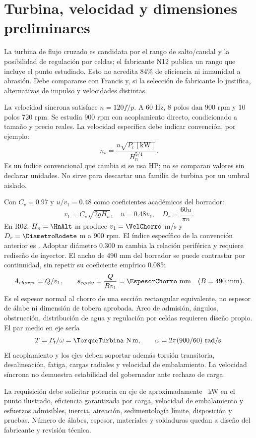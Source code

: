 
\section{Turbina, velocidad y dimensiones preliminares}
La turbina de flujo cruzado es candidata por el rango de salto/caudal y la posibilidad de regulación por celdas; el fabricante N12 publica un rango que incluye el punto estudiado. Esto no acredita 84\% de eficiencia ni inmunidad a abrasión. Debe compararse con Francis y, si la selección de fabricante lo justifica, alternativas de impulso y velocidades distintas.

La velocidad síncrona satisface $n=120f/p$. A 60 Hz, 8 polos dan 900 rpm y 10 polos 720 rpm. Se estudia 900 rpm con acoplamiento directo, condicionado a tamaño y precio reales. La velocidad específica debe indicar convención, por ejemplo:
\[
n_s=\frac{n\sqrt{P_t\,[\mathrm{kW}]}}{H_n^{5/4}}.
\]
Es un índice convencional que cambia si se usa HP; no se comparan valores sin declarar unidades. No sirve para descartar una familia de turbina por un umbral aislado.

Con $C_v=0.97$ y $u/v_1=0.48$ como coeficientes académicos del borrador:
\[
v_1=C_v\sqrt{2gH_n},\quad u=0.48v_1,\quad D_r=\frac{60u}{\pi n}.
\]
En R02, $H_n=\HnAlt$ m produce $v_1=\VelChorro$ m/s y $D_r=\DiametroRodete$ m a 900 rpm. El índice específico de la convención anterior es \NsTurbina. Adoptar diámetro 0.300 m cambia la relación periférica y requiere rediseño de inyector. El ancho de 490 mm del borrador se puede contrastar por continuidad, sin repetir su coeficiente empírico 0.085:
\[
A_{chorro}=Q/v_1,\qquad s_{equiv}=\frac{Q}{Bv_1}=\EspesorChorro\ \mathrm{mm}\quad (B=490\ \mathrm{mm}).
\]
Es el espesor normal al chorro de una sección rectangular equivalente, no espesor de álabe ni dimensión de tobera aprobada. Arco de admisión, ángulos, obstrucción, distribución de agua y regulación por celdas requieren diseño propio. El par medio en eje sería
\[
T=P_t/\omega=\TorqueTurbina\ \mathrm{N\,m},\qquad \omega=2\pi(900/60)\ \mathrm{rad/s}.
\]
El acoplamiento y los ejes deben soportar además torsión transitoria, desalineación, fatiga, cargas radiales y velocidad de embalamiento. La velocidad síncrona no demuestra estabilidad del gobernador ante rechazo de carga.

La requisición debe solicitar potencia en eje de aproximadamente \PtAlt\ kW en el punto ilustrado, eficiencia garantizada por carga, velocidad de embalamiento y esfuerzos admisibles, inercia, aireación, sedimentología límite, disposición y pruebas. Número de álabes, espesor, materiales y soldaduras quedan a diseño del fabricante y revisión técnica.
